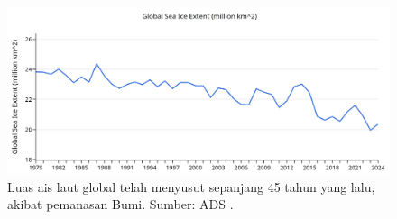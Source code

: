 \documentclass[10pt,twocolumn,letterpaper]{article}
\begin{document}
\begin{figure}[t]
\begin{center}
\includegraphics[width=1\textwidth]{ice.jpg}
\end{center}
   \caption{Luas ais laut global telah menyusut sepanjang 45 tahun yang lalu, akibat pemanasan Bumi. Sumber: ADS \cite{149}.}
\label{fig:24}
\end{figure}

\clearpage
\twocolumn

{\small
\renewcommand{\refname}{Rujukan}


}
\end{document}
